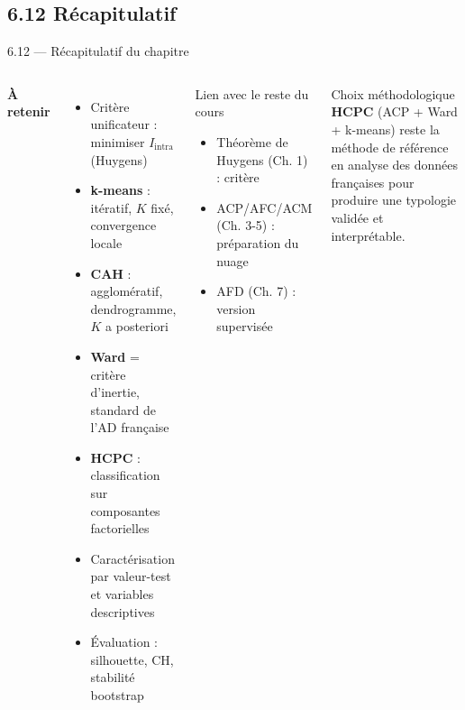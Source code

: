 \subsection{6.12 Récapitulatif}
\begin{frame}{6.12 — Récapitulatif du chapitre}
\begin{columns}[T]
\textbf{À retenir}
\begin{itemize}\small
  \item Critère unificateur : minimiser $I_{\text{intra}}$ (Huygens)
  \item \textbf{k-means} : itératif, $K$ fixé, convergence locale
  \item \textbf{CAH} : agglomératif, dendrogramme, $K$ a posteriori
  \item \textbf{Ward} = critère d'inertie, standard de l'AD française
  \item \textbf{HCPC} : classification sur composantes factorielles
  \item Caractérisation par \alert{valeur-test} et variables descriptives
  \item Évaluation : silhouette, CH, stabilité bootstrap
\end{itemize}

\begin{block}{Lien avec le reste du cours}
\begin{itemize}\small
  \item Théorème de Huygens (Ch. 1) : critère
  \item ACP/AFC/ACM (Ch. 3-5) : préparation du nuage
  \item AFD (Ch. 7) : version supervisée
\end{itemize}
\end{block}

\begin{alertblock}{Choix méthodologique}
\small \textbf{HCPC} (ACP + Ward + k-means) reste la \alert{méthode de
référence} en analyse des données françaises pour produire une
typologie validée et interprétable.
\end{alertblock}
\end{columns}
\end{frame}
